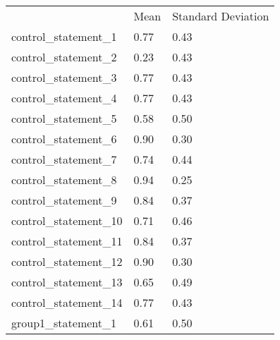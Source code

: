 \documentclass{article}
\begin{document}
\begin{table}[!h]
\centering
\begin{tabular}{lll}
\cline{1-3}
\multicolumn{1}{|l}{} &
  \multicolumn{1}{|l}{Mean} &
  \multicolumn{1}{|l|}{Standard Deviation} \\
\cline{1-3}
\multicolumn{1}{|l}{control\_statement\_1} &
  \multicolumn{1}{|l}{0.77} &
  \multicolumn{1}{|l|}{0.43} \\
\cline{1-3}
\multicolumn{1}{|l}{control\_statement\_2} &
  \multicolumn{1}{|l}{0.23} &
  \multicolumn{1}{|l|}{0.43} \\
\cline{1-3}
\multicolumn{1}{|l}{control\_statement\_3} &
  \multicolumn{1}{|l}{0.77} &
  \multicolumn{1}{|l|}{0.43} \\
\cline{1-3}
\multicolumn{1}{|l}{control\_statement\_4} &
  \multicolumn{1}{|l}{0.77} &
  \multicolumn{1}{|l|}{0.43} \\
\cline{1-3}
\multicolumn{1}{|l}{control\_statement\_5} &
  \multicolumn{1}{|l}{0.58} &
  \multicolumn{1}{|l|}{0.50} \\
\cline{1-3}
\multicolumn{1}{|l}{control\_statement\_6} &
  \multicolumn{1}{|l}{0.90} &
  \multicolumn{1}{|l|}{0.30} \\
\cline{1-3}
\multicolumn{1}{|l}{control\_statement\_7} &
  \multicolumn{1}{|l}{0.74} &
  \multicolumn{1}{|l|}{0.44} \\
\cline{1-3}
\multicolumn{1}{|l}{control\_statement\_8} &
  \multicolumn{1}{|l}{0.94} &
  \multicolumn{1}{|l|}{0.25} \\
\cline{1-3}
\multicolumn{1}{|l}{control\_statement\_9} &
  \multicolumn{1}{|l}{0.84} &
  \multicolumn{1}{|l|}{0.37} \\
\cline{1-3}
\multicolumn{1}{|l}{control\_statement\_10} &
  \multicolumn{1}{|l}{0.71} &
  \multicolumn{1}{|l|}{0.46} \\
\cline{1-3}
\multicolumn{1}{|l}{control\_statement\_11} &
  \multicolumn{1}{|l}{0.84} &
  \multicolumn{1}{|l|}{0.37} \\
\cline{1-3}
\multicolumn{1}{|l}{control\_statement\_12} &
  \multicolumn{1}{|l}{0.90} &
  \multicolumn{1}{|l|}{0.30} \\
\cline{1-3}
\multicolumn{1}{|l}{control\_statement\_13} &
  \multicolumn{1}{|l}{0.65} &
  \multicolumn{1}{|l|}{0.49} \\
\cline{1-3}
\multicolumn{1}{|l}{control\_statement\_14} &
  \multicolumn{1}{|l}{0.77} &
  \multicolumn{1}{|l|}{0.43} \\
\cline{1-3}
\multicolumn{1}{|l}{group1\_statement\_1} &
  \multicolumn{1}{|l}{0.61} &
  \multicolumn{1}{|l|}{0.50} \\

\end{tabular}
\end{table}
\end{document}
